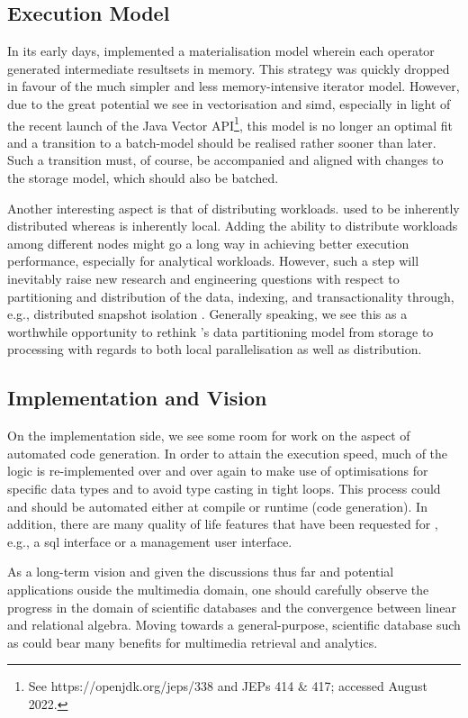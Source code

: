 \subsection{Execution Model}
In its early days, \cottontail{} implemented a materialisation model wherein each operator generated intermediate resultsets in memory. This strategy was quickly dropped in favour of the much simpler and less memory-intensive iterator model. However, due to the great potential we see in vectorisation and \acrshort{simd}, especially in light of the recent launch of the Java Vector API\footnote{See https://openjdk.org/jeps/338 and JEPs 414 \& 417; accessed August 2022.}, this model is no longer an optimal fit and a transition to a batch-model should be realised rather sooner than later. Such a transition must, of course, be accompanied and aligned with changes to the storage model, which should also be batched.

Another interesting aspect is that of distributing workloads. \adampro{} used to be inherently distributed \cite{Giangreco:2016Adam,Giangreco:2018Database} whereas \cottontail{} is inherently local. Adding the ability to distribute workloads among different nodes might go a long way in achieving better execution performance, especially for analytical workloads. However, such a step will inevitably raise new research and engineering questions with respect to partitioning and distribution of the data, indexing, and transactionality through, e.g., distributed snapshot isolation \cite{Binnig:2014Distributed}. Generally speaking, we see this as a worthwhile opportunity to rethink \cottontail's data partitioning model from storage to processing with regards to both local parallelisation as well as distribution.

\subsection{Implementation and Vision}
On the implementation side, we see some room for work on the aspect of automated code generation. In order to attain the execution speed, much of the logic is re-implemented over and over again to make use of optimisations for specific data types and to avoid type casting in tight loops. This process could and should be automated either at compile or runtime (code generation). In addition, there are many quality of life features that have been requested for \cottontail{}, e.g., a \acrshort{sql} interface or a management user interface.

As a long-term vision and given the discussions thus far and potential applications ouside the multimedia domain, one should carefully observe the progress in the domain of scientific databases and the convergence between linear and relational algebra. Moving towards a general-purpose, scientific database such as \cite{Stonebraker:2013SciDB,Luo:2018Scalable,Blacher:2022Machine} could bear many benefits for multimedia retrieval and analytics.